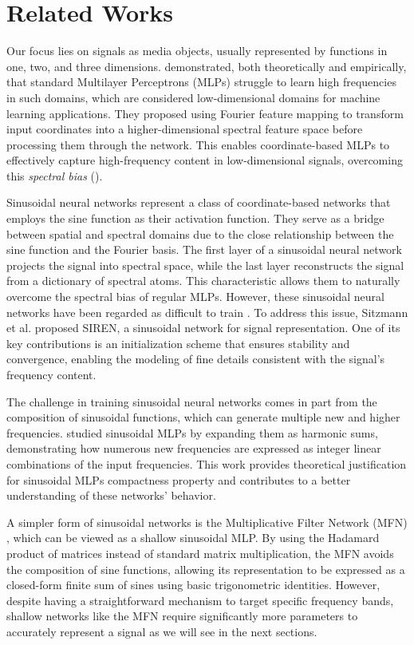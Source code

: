 \section{Related Works}

Our focus lies on signals as media objects, usually represented by functions in one, two, and three dimensions. \cite{tancik2020fourfeat} demonstrated, both theoretically and empirically, that standard Multilayer Perceptrons (MLPs) struggle to learn high frequencies in such domains, which are considered low-dimensional domains for machine learning applications. They proposed using Fourier feature mapping to transform input coordinates into a higher-dimensional spectral feature space before processing them through the network. This enables coordinate-based MLPs to effectively capture high-frequency content in low-dimensional signals, overcoming this \textit{spectral bias} (\cite{rahaman2018spectral}).

Sinusoidal neural networks represent a class of coordinate-based networks that employs the sine function as their activation function. They serve as a bridge between spatial and spectral domains due to the close relationship between the sine function and the Fourier basis. The first layer of a sinusoidal neural network projects the signal into spectral space, while the last layer reconstructs the signal from a dictionary of spectral atoms. This characteristic allows them to naturally overcome the spectral bias of regular MLPs. However, these sinusoidal neural networks have been regarded as difficult to train \cite{taming2017}. To address this issue, Sitzmann et al. \cite{sitzmann2019siren} proposed SIREN, a sinusoidal network for signal representation. One of its key contributions is an initialization scheme that ensures stability and convergence, enabling the modeling of fine details consistent with the signal’s frequency content.

The challenge in training sinusoidal neural networks comes in part from the composition of sinusoidal functions, which can generate multiple new and higher frequencies. \cite{novello2022understanding} studied sinusoidal MLPs by expanding them as harmonic sums, demonstrating how numerous new frequencies are expressed as integer linear combinations of the input frequencies. This work provides theoretical justification for sinusoidal MLPs compactness property and contributes to a better understanding of these networks’ behavior.

A simpler form of sinusoidal networks is the Multiplicative Filter Network (MFN) \cite{fathony2020multiplicative}, which can be viewed as a shallow sinusoidal MLP. By using the Hadamard product of matrices instead of standard matrix multiplication, the MFN avoids the composition of sine functions, allowing its representation to be expressed as a closed-form finite sum of sines using basic trigonometric identities. However, despite having a straightforward mechanism to target specific frequency bands, shallow networks like the MFN require significantly more parameters to accurately represent a signal as we will see in the next sections.

